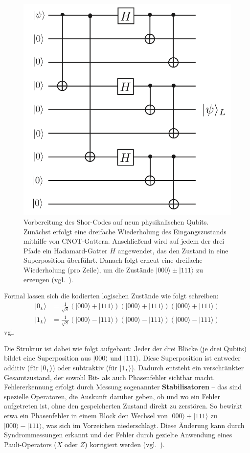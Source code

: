 \begin{figure}[htbp]
  \centering
  \includegraphics[width=0.75\linewidth]{images/error-correction/Abb3_ShorCode_1.png}
  \caption{Vorbereitung des Shor-Codes auf neun physikalischen Qubits. Zunächst erfolgt eine dreifache Wiederholung des Eingangszustands mithilfe von CNOT-Gattern. Anschließend wird auf jedem der drei Pfade ein Hadamard-Gatter \(H\) angewendet, das den Zustand in eine Superposition überführt. Danach folgt erneut eine dreifache Wiederholung (pro Zeile), um die Zustände \(|000\rangle \pm |111\rangle\) zu erzeugen (vgl.\ \cite[10]{devitt_quantum_2013}).}
  \label{fig:shor_preparation}
\end{figure}

Formal lassen sich die kodierten logischen Zustände wie folgt schreiben:
\[
\begin{aligned}
|0_L\rangle &= \frac{1}{\sqrt{8}} (|000\rangle + |111\rangle)(|000\rangle + |111\rangle)(|000\rangle + |111\rangle) \\
|1_L\rangle &= \frac{1}{\sqrt{8}} (|000\rangle - |111\rangle)(|000\rangle - |111\rangle)(|000\rangle - |111\rangle)
\end{aligned}
\]
vgl.~\cite[10]{devitt_quantum_2013}

Die Struktur ist dabei wie folgt aufgebaut: Jeder der drei Blöcke (je drei Qubits) bildet eine Superposition aus \(|000\rangle\) und \(|111\rangle\). Diese Superposition ist entweder additiv (für \(|0_L\rangle\)) oder subtraktiv (für \(|1_L\rangle\)). Dadurch entsteht ein verschränkter Gesamtzustand, der sowohl Bit- als auch Phasenfehler sichtbar macht.
Fehlererkennung erfolgt durch Messung sogenannter \textbf{Stabilisatoren} – das sind spezielle Operatoren, die Auskunft darüber geben, ob und wo ein Fehler aufgetreten ist, ohne den gespeicherten Zustand direkt zu zerstören. So bewirkt etwa ein Phasenfehler in einem Block den Wechsel von \(|000\rangle + |111\rangle\) zu \(|000\rangle - |111\rangle\), was sich im Vorzeichen niederschlägt. Diese Änderung kann durch Syndrommessungen erkannt und der Fehler durch gezielte Anwendung eines Pauli-Operators (\(X\) oder \(Z\)) korrigiert werden (vgl.~\cite[432-433]{nielsen_quantum_2010}).

